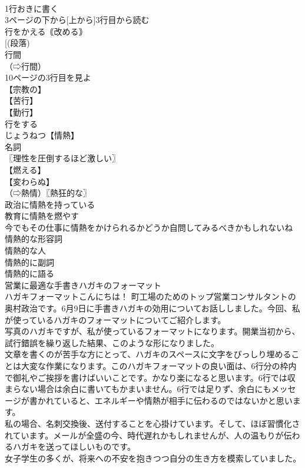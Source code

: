 \documentclass[8pt]{extreport}
\begin{document}
\begin{CJK}{UTF8}{min}
\\	1行おきに書く
\\	3ページの下から[上から]3行目から読む
\\	行をかえる｟改める｠
\\	[(段落) 
\\	行間
\\	（⇨行間）
\\	10ページの3行目を見よ
\\	【宗教の】
\\	【苦行】
\\	【勤行】
\\	行をする
\\	じょうねつ【情熱】
\\	名詞
\\	〖理性を圧倒するほど激しい〗
\\	【燃える】
\\	【変わらぬ】
\\	（⇨熱情）〖熱狂的な〗
\\	政治に情熱を持っている
\\	教育に情熱を燃やす
\\	今でもその仕事に情熱をかけられるかどうか自問してみるべきかもしれないね
\\	情熱的な形容詞
\\	情熱的な人
\\	情熱的に副詞
\\	情熱的に語る
\\	営業に最適な手書きハガキのフォーマット
\\	ハガキフォーマットこんにちは！ 町工場のためのトップ営業コンサルタントの奥村政治です。6月9日に手書きハガキの効用についてお話ししました。今回、私が使っているハガキのフォーマットについてご紹介します。
\\	写真のハガキですが、私が使っているフォーマットになります。開業当初から、試行錯誤を繰り返した結果、このような形になりました。
\\	文章を書くのが苦手な方にとって、ハガキのスペースに文字をびっしり埋めることは大変な作業になります。このハガキフォーマットの良い面は、6行分の枠内で御礼やご挨拶を書けばいいことです。かなり楽になると思います。6行では収まらない場合は余白に書いてもかまいません。6行では足りず、余白にもメッセージが書かれていると、エネルギーや情熱が相手に伝わるのではないかと思います。
\\	私の場合、名刺交換後、送付することを心掛けています。そして、ほぼ習慣化されています。メールが全盛の今、時代遅れかもしれませんが、人の温もりが伝わるハガキを送ってほしいものです。
\\	女子学生の多くが、将来への不安を抱きつつ自分の生き方を模索していました。		

\end{CJK}
\end{document}
